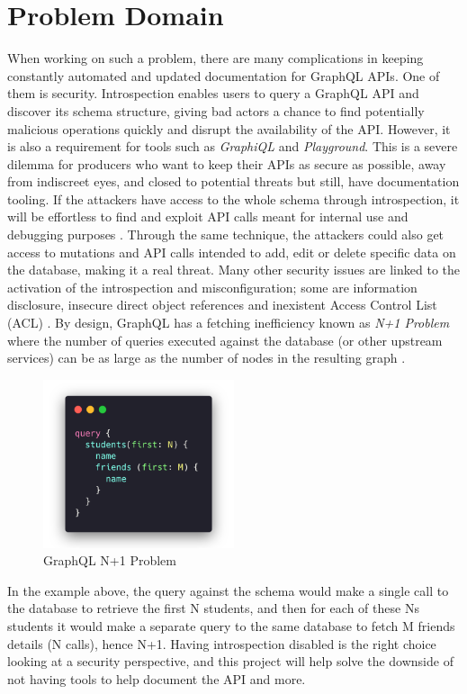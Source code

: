 \section*{Problem Domain}
\label{s:Problem-Domain}
When working on such a problem, there are many complications in keeping
constantly automated and updated documentation for GraphQL APIs. One of them is
security. Introspection enables users to query a GraphQL API and discover its
schema structure, giving bad actors a chance to find potentially malicious
operations \citep{khalilWhyYouShould2021} quickly and disrupt the availability
of the API. However, it is also a requirement for tools such as
\textit{GraphiQL} and \textit{Playground}. This is a severe dilemma for
producers who want to keep their APIs as secure as possible, away from
indiscreet eyes, and closed to potential threats but still, have documentation
tooling. If the attackers have access to the whole schema through introspection,
it will be effortless to find and exploit API calls meant for internal use and
debugging purposes \citep{rizwanGraphQLCommonVulnerabilities2021}. Through the
same technique, the attackers could also get access to mutations and API calls
intended to add, edit or delete specific data on the database, making it a real
threat. Many other security issues are linked to the activation of the
introspection and misconfiguration; some are information disclosure, insecure
direct object references and inexistent Access Control List (ACL) \citep{
yeswehackHowExploitGraphQL2021}. By design, GraphQL has a fetching inefficiency
known as \textit{N+1 Problem} where the number of queries executed against the
database (or other upstream services) can be as large as the number of nodes in
the resulting graph \citep{ graphqlbypopSuppressingProblemGraphQL2020}.
\begin{figure}[H]
  \centering
  \includegraphics[width=0.5\textwidth]{figures/code/n+1}
  \caption{GraphQL N+1 Problem}
  \label{f:GraphQL-N1-Problem}
\end{figure}
In the example above, the query against the schema would make a single call to
the database to retrieve the first N students, and then for each of these Ns
students it would make a separate query to the same database to fetch M friends
details (N calls), hence N+1. Having introspection disabled is the right choice
looking at a security perspective, and this project will help solve the downside
of not having tools to help document the API and more.

